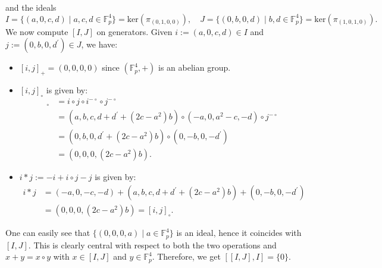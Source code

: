 \documentclass{amsart}
\theoremstyle{definition}
\begin{document}
and the ideals 
\[
I = \{(a,0,c,d) \mid a,c,d \in \mathbb{F}_p^4\}=\mathrm{ker}(\pi_{(0,1,0,0)}),\quad J = \{(0,b,0,d) \mid b,d \in \mathbb{F}_p^4\}=\mathrm{ker}(\pi_{(1,0,1,0)}).
\]
We now compute $[I,J]$ on generators. Given $i:=(a,0,c,d) \in I$ and $j:=(0,b,0,d^\prime) \in J$, we have:
\begin{itemize}
    \item $[i,j]_+=(0,0,0,0)$ since $(\mathbb{F}^4_p,+)$ is an abelian group.
    \item $[i,j]_\circ$ is given by:
    \begin{align*}
    [i,j]_\circ &=i\circ j  \circ i^{-\circ} \circ j^{-\circ}   \\
    &=(a,b,c,d+d^\prime+(2c-a^2)b)\circ (-a,0,a^2-c,-d)\circ j^{-\circ} \\
    &=(0,b,0,d^\prime +(2c-a^2)b) \circ (0,-b,0,-d^\prime)\\
    &=(0,0,0,(2c-a^2)b).
    \end{align*}
    \item $i*j:=-i+i \circ j - j$ is given by:
    \begin{align*}
    i*j &= (-a,0,-c,-d)+(a,b,c,d+d^\prime+(2c-a^2)b)+(0,-b,0,-d^\prime) \\
    &= (0,0,0,(2c-a^2)b) = [i,j]_\circ .
    \end{align*}
\end{itemize}
One can easily see that $\{(0,0,0,a) \mid a \in \mathbb{F}^4_p\}$ is an ideal, hence it coincides with $[I,J]$. This is clearly central with respect to both the two operations and $x+y=x\circ y$ with $x\in [I,J]$ and $y\in\mathbb{F}^4_p$. Therefore, we get $[[I,J],I]=\{0\}$.
\end{document}
